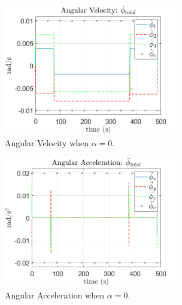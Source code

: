 \documentclass[letterpaper, preprint, paper,11pt]{AAS}	%
\begin{document}
			\begin{multicols}{2}
				\begin{figure}[H]
					\begin{center}
						\includegraphics[width=3in]{figures/alpha0/ang_vel.png}
					\end{center}
					\caption{Angular Velocity when $\alpha=0$.}
					\label{fig:ang_vel_phi_total_alpha0}
				\end{figure}
				\columnbreak
				\begin{figure}[H]
					\begin{center}
						\includegraphics[width=3in]{figures/alpha0/ang_accel.png}
					\end{center}
					\caption{Angular Acceleration when $\alpha=0$.}
					\label{fig:ang_accel_total_alpha0}
				\end{figure}
			\end{multicols}
		
\end{document}
